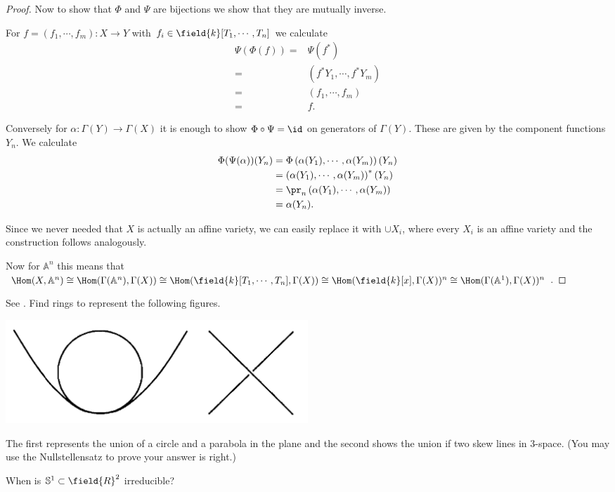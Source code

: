 \begin{proof}
Now to show that $\Phi$ and $\Psi$ are bijections we show that they
are mutually inverse.

For $f = (f_1,\cdots ,f_m) \colon X\rightarrow Y$ with $f_i \in \field{k}[T_1,\cdots, T_n]$ we calculate
\begin{align*}
  \Psi(\Phi(f)) =& \Psi (f^*)\\
  =& \left( f^* Y_1,\cdots , f^* Y_m\right)\\
  =& \left( f_1 , \cdots ,f_m \right) \\
  =& f.
\end{align*}

Conversely for $\alpha \colon \Gamma(Y) \rightarrow \Gamma(X)$ it is
enough to show $\Phi \circ \Psi = \id$ on generators of
$\Gamma(Y)$. These are given by the component functions $Y_n$.
We calculate
\begin{align*}
  \Phi ( \Psi ( \alpha)) ( Y_n) &= \Phi \left( \alpha(Y_1)
                                  , \cdots , \alpha(Y_m) \right) ( Y_n)\\
                                &=  \left( \alpha(Y_1)
                                  , \cdots , \alpha(Y_m) \right)^* (
                                  Y_n)\\
                                &=\pr_n \left( \alpha(Y_1)
                                  , \cdots , \alpha(Y_m) \right)\\
                                &= \alpha (Y_n).
\end{align*}

Since we never needed that $X$ is actually an affine variety, we can
easily replace it with $\cup X_i$, where every $X_i$ is an affine
variety and the construction follows analogously.

\vspace{\baselineskip}

Now for $\mathbb{A}^n$ this means that $\Hom(X,\mathbb{A}^n) \cong
\Hom (\Gamma (\mathbb{A}^n), \Gamma (X)) \cong \Hom
(\field{k}[T_1,\cdots, T_n],\Gamma(X)) \cong \Hom (\field{k}[x],
\Gamma(X))^n \cong \Hom(\Gamma(\mathbb{A}^1),\Gamma(X))^n$.
\end{proof}

\begin{exercise}
  See \cite[Exercise 1.10]{eisenbud1995commutative}.
  Find rings to represent the following figures.
  \begin{center}
  \includegraphics[width = 0.5\textwidth]{../included_media/ex-1-10-eisenbud.png}
\end{center}
The first represents the union of a circle and a parabola in the
  plane and the second shows the union if two skew lines in
  $3$-space. (You may use the Nullstellensatz to prove your answer is right.)
\end{exercise}

\begin{exercise}
  When is $\mathbb{S}^1\subset \field{R}^2$ irreducible?
\end{exercise}


